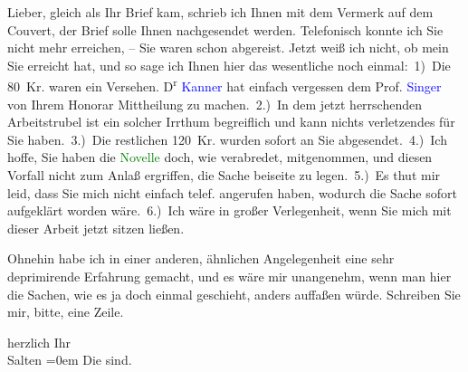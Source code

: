 \pstart
           Lieber, gleich als Ihr Brief kam, schrieb ich Ihnen
               mit dem Vermerk auf dem Couvert, der Brief solle Ihnen nachgesendet werden.
               Telefonisch konnte ich Sie nicht mehr erreichen, – Sie waren schon abgereist. Jetzt
               weiß ich nicht, ob mein \label{K_L03334-1v}\label{K_L03334-1h} Sie erreicht hat, und so sage ich Ihnen hier das wesentliche noch
               einmal: 1) Die 80 Kr. waren ein Versehen. D\textsuperscript{r}{ }\textcolor{blue}{Kanner}{}\ledrightnote{\textcolor{blue}{Heinrich Kanner}} hat einfach vergessen dem Prof. \textcolor{blue}{Singer}{}\ledrightnote{\textcolor{blue}{Isidor Singer}} von Ihrem Honorar Mittheilung zu
               machen. 2.) In dem jetzt herrschenden Arbeitstrubel ist ein solcher Irrthum
               begreiflich und kann nichts verletzendes für Sie haben. 3.) Die restlichen 120 Kr.
               wurden sofort an Sie abgesendet. 4.) Ich hoffe, Sie haben die \textcolor{green}{Novelle}{}\ledrightnote{{$\rightarrow$}\textcolor{green}{Die griechische Tänzerin. Novellette}} doch, wie verabredet, mitgenommen,
               und diesen Vorfall nicht zum Anlaß ergriffen, die Sache beiseite zu legen. 5.) Es
               thut mir leid, dass Sie mich nicht einfach telef. angerufen haben, wodurch die Sache
               sofort aufgeklärt worden wäre. 6.) Ich wäre in großer Verlegenheit, wenn Sie mich mit
               dieser Arbeit jetzt sitzen ließen.\pend
           
\pstart
           Ohnehin habe ich in einer anderen, ähnlichen Angelegenheit eine sehr deprimirende
               Erfahrung gemacht, und es wäre mir unangenehm, wenn man hier die Sachen, wie es ja
               doch einmal geschieht, anders auffaßen würde. Schreiben Sie mir, bitte, eine
               Zeile.\pend
           
\pstart
           herzlich Ihr {\\[\baselineskip]}\spacefill\mbox{Salten}\pend
           \leftskip=0em{}
\pstart
           \noindent{}\label{K_L03334-2v}\label{K_L03334-2h} Die \label{K_L03334-3v}\label{K_L03334-3h} sind.\pend
           \endnumbering{}  
      